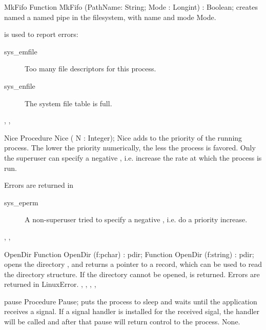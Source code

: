 
\begin{function}{MkFifo}
\Declaration
Function MkFifo (PathName: String; Mode : Longint) : Boolean;
\Description
{} creates named a named pipe in the filesystem, with name
 and mode {Mode}. 

\Errors
  is used to report errors:
\begin{description}
\item[sys\_emfile] Too many file descriptors for this process.
\item[sys\_enfile] The system file table is full.
\end{description}

\SeeAlso
{}, , 
\end{function}

\begin{procedure}{Nice}
\Declaration
Procedure Nice ( N : Integer);
\Description
Nice adds  to the priority of the running process. The lower the
priority numerically, the less the process is favored.
Only the superuser can specify a negative , i.e. increase the rate at
which the process is run.

\Errors
 Errors are returned in 
\begin{description}
\item [sys\_eperm] A non-superuser tried to specify a negative , i.e.
do a priority increase.
\end{description}

\SeeAlso
{}, , 
\end{procedure}


\begin{function}{OpenDir}
\Declaration
Function OpenDir (f:pchar) : pdir;
Function OpenDir (f:string) : pdir;
\Description
  opens the directory  , and returns a 
pointer to a  record, which can be used to read the directory 
structure. If the directory cannot be opened,  is returned.
\Errors
Errors are returned in LinuxError.
\SeeAlso
{}, , , ,
\end{function}




\begin{procedure}{pause}
\Declaration
Procedure Pause;
\Description
{} puts the process to sleep and waits until the application 
receives  a signal. If a signal handler is installed for the received 
sigal, the handler will be called and after that pause will return 
control to the process.
\Errors
None.
\end{procedure}

